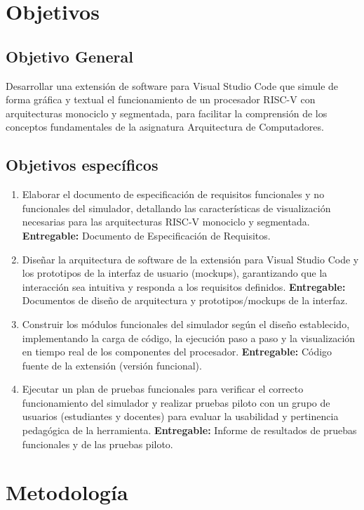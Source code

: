 \documentclass[12pt, letterpaper]{article}
\begin{document}
\section{Objetivos}

\subsection{Objetivo General}
Desarrollar una extensión de software para Visual Studio Code que simule de forma gráfica y textual el funcionamiento de un procesador RISC-V con arquitecturas monociclo y segmentada, para facilitar la comprensión de los conceptos fundamentales de la asignatura Arquitectura de Computadores.

\subsection{Objetivos específicos}
\begin{enumerate}
    \item Elaborar el documento de especificación de requisitos funcionales y no funcionales del simulador, detallando las características de visualización necesarias para las arquitecturas RISC-V monociclo y segmentada. \textbf{Entregable:} Documento de Especificación de Requisitos.
    \item Diseñar la arquitectura de software de la extensión para Visual Studio Code y los prototipos de la interfaz de usuario (mockups), garantizando que la interacción sea intuitiva y responda a los requisitos definidos. \textbf{Entregable:} Documentos de diseño de arquitectura y prototipos/mockups de la interfaz.
    \item Construir los módulos funcionales del simulador según el diseño establecido, implementando la carga de código, la ejecución paso a paso y la visualización en tiempo real de los componentes del procesador. \textbf{Entregable:} Código fuente de la extensión (versión funcional).
    \item Ejecutar un plan de pruebas funcionales para verificar el correcto funcionamiento del simulador y realizar pruebas piloto con un grupo de usuarios (estudiantes y docentes) para evaluar la usabilidad y pertinencia pedagógica de la herramienta. \textbf{Entregable:} Informe de resultados de pruebas funcionales y de las pruebas piloto.
\end{enumerate}



\section{Metodología}
\end{document}
